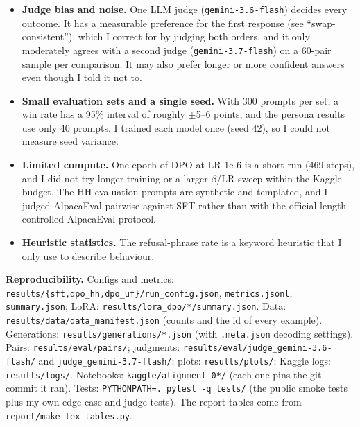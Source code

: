 \documentclass[10pt,a4paper]{article}
\newcommand{\code}[1]{\texttt{\small #1}}
\begin{document}
\begin{itemize}
\item \textbf{Judge bias and noise.} One LLM judge (\code{gemini-3.6-flash}) decides every outcome. It has a measurable preference for the first
response (see ``swap-consistent''), which I correct for by judging both orders, and it only moderately agrees with a second judge
(\code{gemini-3.7-flash}) on a 60-pair sample per comparison. It may also prefer longer or more confident answers even though I told it not to.
\item \textbf{Small evaluation sets and a single seed.} With 300 prompts per set, a win rate has a 95\% interval of roughly $\pm$5--6 points, and
the persona results use only 40 prompts. I trained each model once (seed 42), so I could not measure seed variance.
\item \textbf{Limited compute.} One epoch of DPO at LR 1e-6 is a short run (469 steps), and I did not try longer training or a larger $\beta$/LR
sweep within the Kaggle budget. The HH evaluation prompts are synthetic and templated, and I judged AlpacaEval pairwise against SFT rather than
with the official length-controlled AlpacaEval protocol.
\item \textbf{Heuristic statistics.} The refusal-phrase rate is a keyword heuristic that I only use to describe behaviour.
\end{itemize}

\sloppy\textbf{Reproducibility.} Configs and metrics: \code{results/\{sft,dpo\_hh,dpo\_uf\}/run\_config.json}, \code{metrics.jsonl},
\code{summary.json}; LoRA: \code{results/lora\_dpo/*/summary.json}. Data: \code{results/data/data\_manifest.json} (counts and the id of every
example). Generations: \code{results/generations/*.json} (with \code{.meta.json} decoding settings). Pairs: \code{results/eval/pairs/};
judgments: \code{results/eval/judge\_gemini-3.6-flash/} and \code{judge\_gemini-3.7-flash/}; plots: \code{results/plots/}; Kaggle logs:
\code{results/logs/}. Notebooks: \code{kaggle/alignment-0*/} (each one pins the git commit it ran). Tests: \code{PYTHONPATH=. pytest -q tests/}
(the public smoke tests plus my own edge-case and judge tests). The report tables come from \code{report/make\_tex\_tables.py}.
\end{document}
